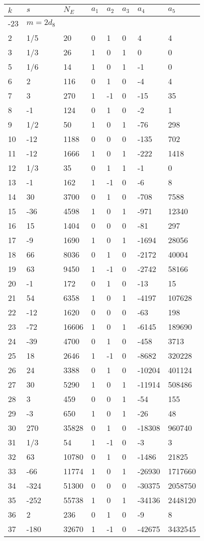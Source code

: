 \documentclass{amsart}
\begin{document}
\begin{longtable}{|l|l|l|lllll|}
\hline
$k$ & $s$ & $N_E$ & $a_1$ & $a_2$ & $a_3$ & $a_4$ & $a_5$\\
\hline
-23&$m=2d_{8}$&&\multicolumn{5}{c|}{}\\
2&1/5&20&0&1&0&4&4\\
3&1/3&26&1&0&1&0&0\\
5&1/6&14&1&0&1&-1&0\\
6&2&116&0&1&0&-4&4\\
7&3&270&1&-1&0&-15&35\\
8&-1&124&0&1&0&-2&1\\
9&1/2&50&1&0&1&-76&298\\
10&-12&1188&0&0&0&-135&702\\
11&-12&1666&1&0&1&-222&1418\\
12&1/3&35&0&1&1&-1&0\\
13&-1&162&1&-1&0&-6&8\\
14&30&3700&0&1&0&-708&7588\\
15&-36&4598&1&0&1&-971&12340\\
16&15&1404&0&0&0&-81&297\\
17&-9&1690&1&0&1&-1694&28056\\
18&66&8036&0&1&0&-2172&40004\\
19&63&9450&1&-1&0&-2742&58166\\
20&-1&172&0&1&0&-13&15\\
21&54&6358&1&0&1&-4197&107628\\
22&-12&1620&0&0&0&-63&198\\
23&-72&16606&1&0&1&-6145&189690\\
24&-39&4700&0&1&0&-458&3713\\
25&18&2646&1&-1&0&-8682&320228\\
26&24&3388&0&1&0&-10204&401124\\
27&30&5290&1&0&1&-11914&508486\\
28&3&459&0&0&1&-54&155\\
29&-3&650&1&0&1&-26&48\\
30&270&35828&0&1&0&-18308&960740\\
31&1/3&54&1&-1&0&-3&3\\
32&63&10780&0&1&0&-1486&21825\\
33&-66&11774&1&0&1&-26930&1717660\\
34&-324&51300&0&0&0&-30375&2058750\\
35&-252&55738&1&0&1&-34136&2448120\\
36&2&236&0&1&0&-9&8\\
37&-180&32670&1&-1&0&-42675&3432545\\

\end{longtable}
\end{document}
